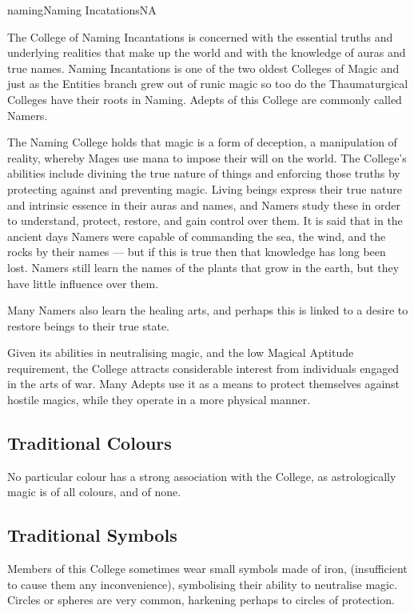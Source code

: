 \begin{College}[2.0]{naming}{Naming Incatations}{NA}

The College of Naming Incantations is concerned with the essential
truths and underlying realities that make up the world and with the
knowledge of auras and true names.  Naming Incantations is one of the
two oldest Colleges of Magic and just as the Entities branch grew out
of runic magic so too do the Thaumaturgical Colleges have their roots
in Naming.  Adepts of this College are commonly called Namers.

The Naming College holds that magic is a form of deception, a
manipulation of reality, whereby Mages use mana to impose their will
on the world.  The College’s abilities include divining the true
nature of things and enforcing those truths by protecting against and
preventing magic.  Living beings express their true nature and
intrinsic essence in their auras and names, and Namers study these in
order to understand, protect, restore, and gain control over them. It
is said that in the ancient days Namers were capable of commanding the
sea, the wind, and the rocks by their names — but if this is true then
that knowledge has long been lost.  Namers still learn the names of
the plants that grow in the earth, but they have little influence over
them.

Many Namers also learn the healing arts, and perhaps this is linked to
a desire to restore beings to their true state.

Given its abilities in neutralising magic, and the low Magical
Aptitude requirement, the College attracts considerable interest from
individuals engaged in the arts of war. Many Adepts use it as a means
to protect themselves against hostile magics, while they operate in a
more physical manner.

\subsection{Traditional Colours}

No particular colour has a strong association with the College, as
astrologically magic is of all colours, and of none.

\subsection{Traditional Symbols}

Members of this College sometimes wear small symbols made of iron,
(insufficient to cause them any inconvenience), symbolising their
ability to neutralise magic. Circles or spheres are very common,
harkening perhaps to circles of protection.


\end{College}
